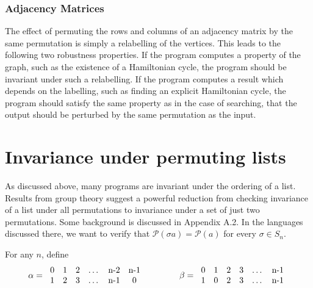\documentclass{llncs}
\begin{document}
    \vspace{-0.2in}
    \subsubsection{Adjacency Matrices}

      The effect of permuting the rows and columns of an adjacency matrix by the same
      permutation is simply a relabelling of the vertices.  This leads to the following
      two robustness properties.  If the program computes a
      property of the graph, such as the existence of a Hamiltonian cycle, the program
      should be invariant under such a relabelling.  If the program computes a result
      which depends on the labelling, such as finding an explicit Hamiltonian cycle,
      the program should satisfy the same property as in the case of searching, that
      the output should be perturbed by the same permutation as the input.


\section{Invariance under permuting lists}
\label{permlists}

  As discussed above, many programs are invariant under the ordering of a list.
  Results from group theory  suggest a powerful 
  reduction from checking invariance of a list under all permutations
  to invariance under a set of just two permutations.
  Some background is discussed in Appendix A.2.
  In the languages discussed there, we want to verify that
  $\mathcal{P}(\sigma a) = \mathcal{P}(a)$ for every $\sigma\in S_n$.

  For any $n$, define
  \[
    \alpha = 
      \begin{tabular}{c@{\hspace{1em}}c@{\hspace{1em}}c@{\hspace{1em}}c@{\hspace{1em}}c@{\hspace{1em}}c}
      0 & 1 & 2 & \ldots & n-2 & n-1\\
      1 & 2 & 3 & \ldots & n-1 & 0
      \end{tabular}
    \qquad \qquad
    \beta = 
      \begin{tabular}{c@{\hspace{1em}}c@{\hspace{1em}}c@{\hspace{1em}}c@{\hspace{1em}}c@{\hspace{1em}}c}
      0 & 1 & 2 & 3 & \ldots & n-1\\
      1 & 0 & 2 & 3 & \ldots & n-1
      \end{tabular}
  \]
\end{document}
